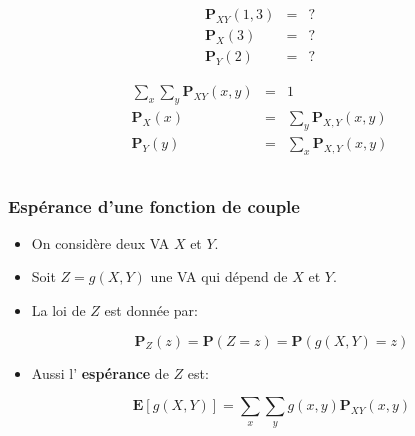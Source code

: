 \documentclass{beamer}
\renewcommand{\P}{\mathbf{P}}
\newcommand{\E}{\mathbf{E}}
\begin{document}
\begin{frame}[t]
\begin{columns}
\begin{column}{0.6\textwidth}
{\begin{tcolorbox}[title=Loi de couple de VA]
        \end{tcolorbox}
      }

    {
      \begin{eqnarray*}
           \P_{XY}(1, 3) &=&  ?\\
           \P_{X}(3)     &=& ? \\
           \P_Y(2)       &=& ?
      \end{eqnarray*}
    }

    {
      \begin{eqnarray*}
           \sum_x\sum_y\P_{XY}(x, y) &=&  1\\
           \P_{X}(x)     &=& \sum_y \P_{X,Y}(x,y) \\
           \P_Y(y)      &=& \sum_x \P_{X,Y}(x,y)
      \end{eqnarray*}
    }
    \end{column}
  \end{columns}
\end{frame}
\begin{frame}[t]
  \frametitle{Espérance d'une fonction de couple}
 \begin{itemize}
   \small
   \item On considère deux \ac{VA} $X$ et $Y$.\\[4pt]
   \item Soit \alert{$Z = g(X,Y)$} une \ac{VA}  qui dépend de $X$ et $Y$.\\[4pt]
   \item La loi de $Z$ est donnée par:\vspace*{.5cm}
     \begin{center}
       \begin{minipage}{.7\textwidth}
         
         \begin{tcolorbox}
          $$
          \P_Z(z) = \P(Z = z) = \P(g(X,Y) = z)
          $$
         \end{tcolorbox}
       \end{minipage}
     \end{center}
     
     \vspace{.5cm}
  \item Aussi l' \alert{\textbf{espérance}}  de $Z$ est:
     \begin{center}
       \begin{minipage}{.7\textwidth}
         \begin{tcolorbox}
          $$
          \E[g(X,Y)] = \sum_x \sum_y g(x,y)\P_{XY}(x,y)
          $$
         \end{tcolorbox}
       \end{minipage}
     \end{center}

 \end{itemize} 
\end{frame}
\end{document}
